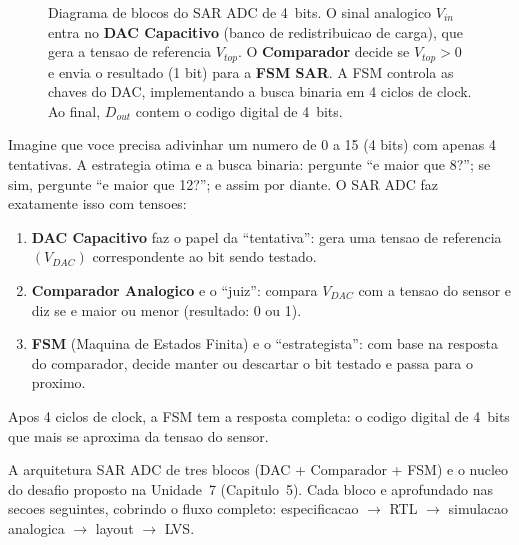 \documentclass[12pt, a4paper]{article}
\begin{document}
\begin{figure}[H]
\caption{Diagrama de blocos do SAR ADC de 4~bits. O sinal analogico $V_{in}$ entra no
\textbf{DAC Capacitivo} (banco de redistribuicao de carga), que gera a tensao de referencia
$V_{top}$. O \textbf{Comparador} decide se $V_{top} > 0$ e envia o resultado (1 bit) para
a \textbf{FSM SAR}. A FSM controla as chaves do DAC, implementando a busca binaria em 4 ciclos
de clock. Ao final, $D_{out}$ contem o codigo digital de 4~bits.}
\label{fig:sar_arch}
\end{figure}

\begin{conceitobox}
Imagine que voce precisa adivinhar um numero de 0 a 15 (4 bits) com apenas 4 tentativas.
A estrategia otima e a busca binaria: pergunte ``e maior que 8?''; se sim, pergunte ``e
maior que 12?''; e assim por diante. O SAR ADC faz exatamente isso com tensoes:

\begin{enumerate}
  \item \textbf{DAC Capacitivo} faz o papel da ``tentativa'': gera uma tensao de referencia
        $(V_{DAC})$ correspondente ao bit sendo testado.
  \item \textbf{Comparador Analogico} e o ``juiz'': compara $V_{DAC}$ com a tensao do sensor
        e diz se e maior ou menor (resultado: 0 ou 1).
  \item \textbf{FSM} (Maquina de Estados Finita) e o ``estrategista'': com base na resposta do
        comparador, decide manter ou descartar o bit testado e passa para o proximo.
\end{enumerate}

Apos 4 ciclos de clock, a FSM tem a resposta completa: o codigo digital de 4~bits que mais
se aproxima da tensao do sensor.
\end{conceitobox}

\begin{unidadebox}
A arquitetura SAR ADC de tres blocos (DAC + Comparador + FSM) e o nucleo do desafio
proposto na Unidade~7 (Capitulo~5). Cada bloco e aprofundado nas secoes seguintes, cobrindo
o fluxo completo: especificacao $\to$ RTL $\to$ simulacao analogica $\to$ layout $\to$ LVS.
\end{unidadebox}
\end{document}
